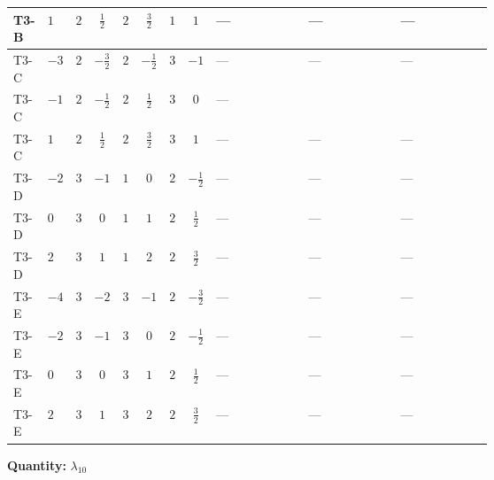 \documentclass[8pt]{article}
\begin{document}
\begin{landscape}
\begin{longtable}{@{}llcccccc >{\raggedright\arraybackslash}p{0.21\linewidth} >{\raggedright\arraybackslash}p{0.21\linewidth} >{\raggedright\arraybackslash}p{0.21\linewidth}@{}}
\midrule
T3-B & $1$ & $2$ & $\frac{1}{2}$ & $2$ & $\frac{3}{2}$ & $1$ & $1$ & --- & --- & --- \\
\midrule
T3-C & $-3$ & $2$ & $-\frac{3}{2}$ & $2$ & $-\frac{1}{2}$ & $3$ & $-1$ & --- & --- & --- \\
\midrule
T3-C & $-1$ & $2$ & $-\frac{1}{2}$ & $2$ & $\frac{1}{2}$ & $3$ & $0$ & --- & \scriptsize\adjustbox{max width=\linewidth}{$\begin{gathered} +4 {\lambda_{9}} (5 \left({\lambda_{10}}\right)^{*}+\left({\lambda_{11}}\right)^{*})\end{gathered}$} & \scriptsize\adjustbox{max width=\linewidth}{$\begin{gathered} -9 {g_2}^2 {\lambda_{10}}\end{gathered}$} \\
\midrule
T3-C & $1$ & $2$ & $\frac{1}{2}$ & $2$ & $\frac{3}{2}$ & $3$ & $1$ & --- & --- & --- \\
\midrule
T3-D & $-2$ & $3$ & $-1$ & $1$ & $0$ & $2$ & $-\frac{1}{2}$ & --- & --- & --- \\
\midrule
T3-D & $0$ & $3$ & $0$ & $1$ & $1$ & $2$ & $\frac{1}{2}$ & --- & --- & --- \\
\midrule
T3-D & $2$ & $3$ & $1$ & $1$ & $2$ & $2$ & $\frac{3}{2}$ & --- & --- & --- \\
\midrule
T3-E & $-4$ & $3$ & $-2$ & $3$ & $-1$ & $2$ & $-\frac{3}{2}$ & --- & --- & --- \\
\midrule
T3-E & $-2$ & $3$ & $-1$ & $3$ & $0$ & $2$ & $-\frac{1}{2}$ & --- & --- & --- \\
\midrule
T3-E & $0$ & $3$ & $0$ & $3$ & $1$ & $2$ & $\frac{1}{2}$ & --- & --- & --- \\
\midrule
T3-E & $2$ & $3$ & $1$ & $3$ & $2$ & $2$ & $\frac{3}{2}$ & --- & --- & --- \\
\midrule
\bottomrule
\end{longtable}
\clearpage
\noindent\textbf{Quantity: }$\lambda_{10}$\par\smallskip

\end{landscape}
\end{document}

